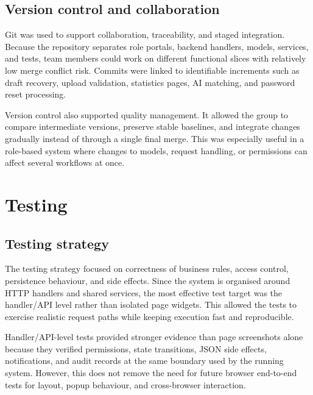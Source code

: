 \documentclass[11pt,a4paper]{article}
\begin{document}
\subsection{Version control and collaboration}

Git was used to support collaboration, traceability, and staged integration. Because the repository separates role portals, backend handlers, models, services, and tests, team members could work on different functional slices with relatively low merge conflict risk. Commits were linked to identifiable increments such as draft recovery, upload validation, statistics pages, AI matching, and password reset processing.

Version control also supported quality management. It allowed the group to compare intermediate versions, preserve stable baselines, and integrate changes gradually instead of through a single final merge. This was especially useful in a role-based system where changes to models, request handling, or permissions can affect several workflows at once.

\section{Testing}

\subsection{Testing strategy}

The testing strategy focused on correctness of business rules, access control, persistence behaviour, and side effects. Since the system is organised around HTTP handlers and shared services, the most effective test target was the handler/API level rather than isolated page widgets. This allowed the tests to exercise realistic request paths while keeping execution fast and reproducible.

Handler/API-level tests provided stronger evidence than page screenshots alone because they verified permissions, state transitions, JSON side effects, notifications, and audit records at the same boundary used by the running system. However, this does not remove the need for future browser end-to-end tests for layout, popup behaviour, and cross-browser interaction.
\end{document}
